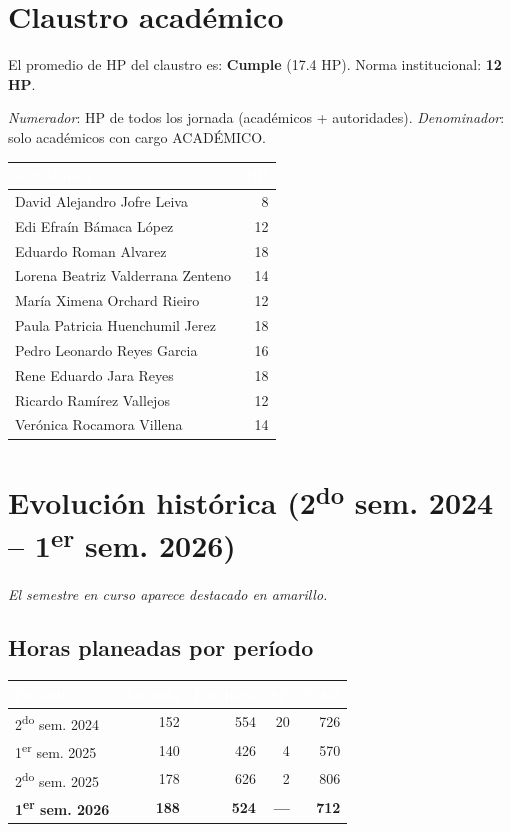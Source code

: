 \documentclass[11pt, a4paper]{article}
\begin{document}
\section{Claustro académico}

El promedio de HP del claustro es: \textcolor{green!60!black}{\textbf{Cumple}} (17.4 HP). Norma institucional: \textbf{12 HP}.

\textit{Numerador}: HP de todos los jornada (académicos + autoridades). \textit{Denominador}: solo académicos con cargo ACADÉMICO.

\begin{tabular}{lr}
\toprule
\rowcolor{usachDark} \textbf{\textcolor{white}{Académico}} & \textbf{\textcolor{white}{HP}} \\
\midrule
David Alejandro Jofre Leiva & 8 \\
\rowcolor{rowEven}Edi Efraín Bámaca López & 12 \\
Eduardo Roman Alvarez & 18 \\
\rowcolor{rowEven}Lorena Beatriz Valderrana Zenteno & 14 \\
María Ximena Orchard Rieiro & 12 \\
\rowcolor{rowEven}Paula Patricia Huenchumil Jerez & 18 \\
Pedro Leonardo Reyes Garcia & 16 \\
\rowcolor{rowEven}Rene Eduardo Jara Reyes & 18 \\
Ricardo Ramírez Vallejos & 12 \\
\rowcolor{rowEven}Verónica Rocamora Villena & 14 \\
\bottomrule
\end{tabular}

\section{Evolución histórica (2\textsuperscript{do} sem. 2024 -- 1\textsuperscript{er} sem. 2026)}

\textit{El semestre en curso aparece destacado en amarillo.}

\subsection{Horas planeadas por período}

\begin{tabular}{lrrrr}
\toprule
\rowcolor{usachDark} \textbf{\textcolor{white}{Periodo}} & \textbf{\textcolor{white}{Jornada}} & \textbf{\textcolor{white}{Por hora}} & \textbf{\textcolor{white}{SP}} & \textbf{\textcolor{white}{Total}} \\
\midrule
2\textsuperscript{do} sem. 2024 & 152 & 554 & 20 & 726 \\
\rowcolor{rowEven}1\textsuperscript{er} sem. 2025 & 140 & 426 & 4 & 570 \\
2\textsuperscript{do} sem. 2025 & 178 & 626 & 2 & 806 \\
\rowcolor{rowHighlight}\textbf{1\textsuperscript{er} sem. 2026} & \textbf{188} & \textbf{524} & \textbf{---} & \textbf{712} \\
\bottomrule
\end{tabular}
\end{document}
